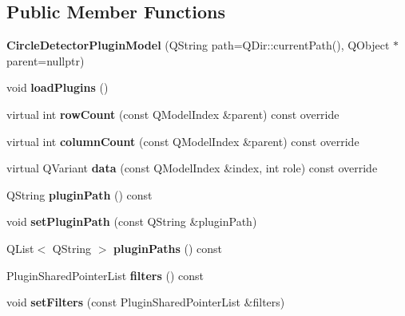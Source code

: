 \subsection*{Public Member Functions}
\begin{DoxyCompactItemize}
\item 
\mbox{\label{class_circle_detector_plugin_model_acd29120e67a9ad1b63d0ebb9483eec8c}} 
{\bfseries Circle\+Detector\+Plugin\+Model} (Q\+String path=Q\+Dir\+::current\+Path(), Q\+Object $\ast$parent=nullptr)
\item 
\mbox{\label{class_circle_detector_plugin_model_aa3d6f8433e2ec9e002e8992fae8a4804}} 
void {\bfseries load\+Plugins} ()
\item 
\mbox{\label{class_circle_detector_plugin_model_a011bb7a9fbac9b5e8d170a6ee03aec91}} 
virtual int {\bfseries row\+Count} (const Q\+Model\+Index \&parent) const override
\item 
\mbox{\label{class_circle_detector_plugin_model_ace00c94a10e90079a346b945ea66dbd5}} 
virtual int {\bfseries column\+Count} (const Q\+Model\+Index \&parent) const override
\item 
\mbox{\label{class_circle_detector_plugin_model_a18ad35fdf00c48e3c235c6a84f6e9c45}} 
virtual Q\+Variant {\bfseries data} (const Q\+Model\+Index \&index, int role) const override
\item 
\mbox{\label{class_circle_detector_plugin_model_ac175bfdbffa6f2017bc23b58af481afd}} 
Q\+String {\bfseries plugin\+Path} () const
\item 
\mbox{\label{class_circle_detector_plugin_model_a0be77904ba2361f24fe153cd6c2c9ebe}} 
void {\bfseries set\+Plugin\+Path} (const Q\+String \&plugin\+Path)
\item 
\mbox{\label{class_circle_detector_plugin_model_a11ea7f6135e738d6b2f6a2aba7ded3ae}} 
Q\+List$<$ Q\+String $>$ {\bfseries plugin\+Paths} () const
\item 
\mbox{\label{class_circle_detector_plugin_model_a44171dff30b2c54ed105381f28bdd0b6}} 
Plugin\+Shared\+Pointer\+List {\bfseries filters} () const
\item 
\mbox{\label{class_circle_detector_plugin_model_a9466b1266d62ae59488512484cd4f8d3}} 
void {\bfseries set\+Filters} (const Plugin\+Shared\+Pointer\+List \&filters)
\end{DoxyCompactItemize}


